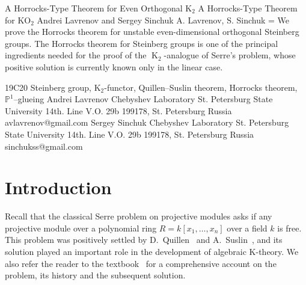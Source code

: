 \documentclass[10pt,a4paper,twoside]{article}
\theoremstyle{remark}
\theoremstyle{definition}
\numberwithin{lemma}{section}
\numberwithin{prop}{section}
\numberwithin{corollary}{section}
\numberwithin{externaltheorem}{section}
\DeclareMathOperator{\K}{K}
\numberwithin{equation}{section}
\def\TSkip{\bigskip}
\def\Abstract{\begingroup\narrower
    \parskip=\medskipamount\parindent=0pt{\caps Abstract. }}
\def\EndAbstract{\par\endgroup\TSkip}
\begin{document}
\Title
A Horrocks-Type Theorem for Even Orthogonal $\mathrm{K}_2$
\ShortTitle 
A Horrocks-Type Theorem for $\mathrm{KO}_2$ 
\SubTitle   
\Author 
Andrei Lavrenov and Sergey Sinchuk
\ShortAuthor 
A. Lavrenov, S. Sinchuk
\EndTitle
\Abstract 
We prove the Horrocks theorem for unstable even-dimensional orthogonal Steinberg groups. The Horrocks theorem for Steinberg groups is one of the principal ingredients needed for the proof of the $\K_2$-analogue of Serre’s problem,  whose positive solution is currently known only in the linear case.
\EndAbstract
\MSC 
19C20
\EndMSC
\KEY 
Steinberg group, $\mathrm{K}_2$-functor, Quillen--Suslin theorem, Horrocks theorem, $\mathbb{P}^1$--glueing
\EndKEY
\Address
Andrei Lavrenov
Chebyshev Laboratory 
St. Petersburg State University 
14th. Line V.O. 29b
199178, St. Petersburg
Russia
avlavrenov@gmail.com
\Address
Sergey Sinchuk
Chebyshev Laboratory 
St. Petersburg State University 
14th. Line V.O. 29b
199178, St. Petersburg
Russia
sinchukss@gmail.com
\Address
\Address
\EndAddress

\section{Introduction}
Recall that the classical Serre problem on projective modules asks if any projective module over a polynomial ring $R = k[x_1,\ldots, x_n]$ over a field $k$ is free. This problem was positively settled by D.~Quillen~\cite{Qu76} and A.~Suslin~\cite{Su76}, and its solution played an important role in the development of algebraic K-theory. We also refer the reader to the textbook~\cite{Lam10} for a comprehensive account on the problem, its history and the subsequent solution.
\end{document}
